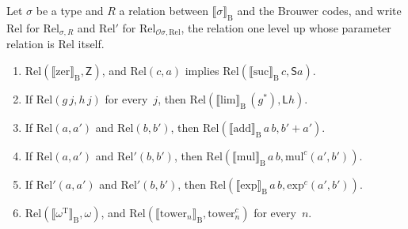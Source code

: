 \documentclass[11pt]{amsart}
\makeatletter
\newcommand{\Dial}{\mathrm{B}}
\newcommand{\Tm}{\mathrm{T}}
\newcommand{\dsem}[1]{\llbracket #1 \rrbracket_{\Dial}}
\newcommand{\kext}[1]{#1^{*}}                %
\newcommand{\bZ}{\mathsf{Z}}
\newcommand{\bS}{\mathsf{S}}
\newcommand{\bL}{\mathsf{L}}
\newcommand{\bplus}{\mathbin{+}}
\newif\ifagdarefs
\newcommand{\AgdaRefs}[1]{\ifagdarefs{\footnotesize\color{agdablue}(#1)}\else\unskip\fi}
\newcommand{\Agda}[2]{{\footnotesize\color{agdablue}\textsf{#1}%
  \ifblank{#2}{}{\texttt{.}\allowbreak\texttt{#2}}}}
\let\ttt@plain\texttt
\renewcommand{\texttt}[1]{{\footnotesize\color{agdablue}\ttt@plain{#1}}}
\theoremstyle{plain}
\theoremstyle{definition}
\makeatother
\begin{document}
\begin{lemma}
\label{lem:rel}
Let $\sigma$ be a type and $R$ a relation between $\dsem\sigma$ and
the Brouwer codes, and write $\mathrm{Rel}$ for
$\mathrm{Rel}_{\sigma,R}$ and $\mathrm{Rel}'$ for
$\mathrm{Rel}_{\mathcal{O}\sigma,\mathrm{Rel}}$, the relation one level
up whose parameter relation is $\mathrm{Rel}$ itself.
\begin{enumerate}
\item\label{item:p-zs}
  $\mathrm{Rel}(\dsem{\mathrm{zer}}, \bZ)$, and
  $\mathrm{Rel}(c, a)$ implies
  $\mathrm{Rel}(\dsem{\mathrm{suc}}\,c, \bS a)$.
\item\label{item:p-lim}
  If $\mathrm{Rel}(g\,j, h\,j)$ for every~$j$, then
  $\mathrm{Rel}(\dsem{\mathrm{lim}}\,(\kext g), \bL h)$.
\item\label{item:p-add}
  If $\mathrm{Rel}(a, a')$ and $\mathrm{Rel}(b, b')$, then
  $\mathrm{Rel}(\dsem{\mathrm{add}}\,a\,b, b' \bplus a')$.
\item\label{item:p-mul}
  If $\mathrm{Rel}(a, a')$ and $\mathrm{Rel}'(b, b')$, then
  $\mathrm{Rel}(\dsem{\mathrm{mul}}\,a\,b, \mathrm{mul}^{c}(a', b'))$.
\item\label{item:p-exp}
  If $\mathrm{Rel}'(a, a')$ and $\mathrm{Rel}'(b, b')$, then
  $\mathrm{Rel}(\dsem{\mathrm{exp}}\,a\,b, \mathrm{exp}^{c}(a', b'))$.
\item\label{item:p-tower}
  $\mathrm{Rel}(\dsem{\omega^{\Tm}}, \omega)$, and
  $\mathrm{Rel}(\dsem{\mathrm{tower}_n}, \mathrm{tower}^{c}_n)$ for
  every~$n$.
\end{enumerate}
\AgdaRefs{\Agda{DialogueTrees.Sharpness}{zerᵀ-Rel}; \texttt{sucᵀ-Rel},
\texttt{limᵀ-Rel}, \texttt{addᵀ-Rel}, \texttt{mulᵀ-Rel},
\texttt{expᵀ-Rel}, \texttt{finᵀ-Rel}, \texttt{ωᵀ-Rel},
\texttt{towerᵀ-Rel}.}
\end{lemma}
\end{document}
